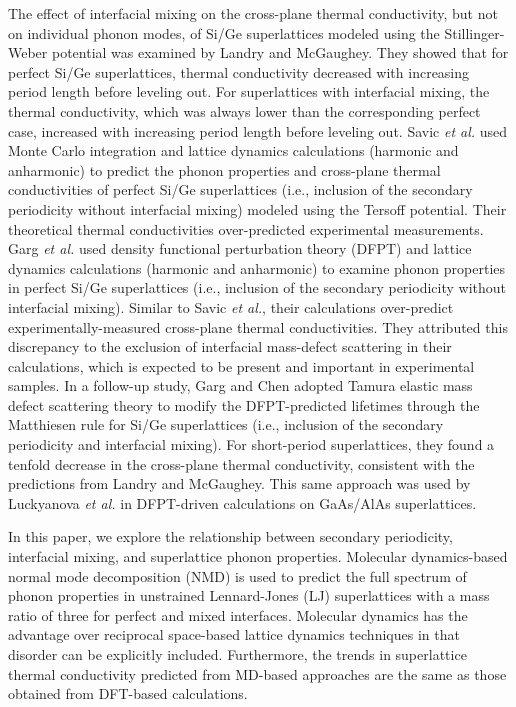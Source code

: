 \documentclass[aps,prb,preprint,preprintnumbers,amsmath,amssymb,floatfix,superscriptaddress]{revtex4}
\begin{document}
The effect of interfacial mixing on the cross-plane thermal conductivity, but not on individual phonon modes, of Si/Ge superlattices modeled using the Stillinger-Weber potential was examined by Landry and McGaughey.\cite{PhysRevB.79.075316} They showed that for perfect Si/Ge superlattices, thermal conductivity decreased with increasing period length before leveling out. For superlattices with interfacial mixing, the thermal conductivity, which was always lower than the corresponding perfect case, increased with increasing period length before leveling out. Savic \textit{et al.} used Monte Carlo integration and lattice dynamics calculations (harmonic and anharmonic) to predict the phonon properties and cross-plane thermal conductivities of perfect Si/Ge superlattices (i.e., inclusion of the secondary periodicity without interfacial mixing) modeled using the Tersoff potential. \cite{savic:073113} Their theoretical thermal conductivities over-predicted experimental measurements. Garg \textit{et al.} used density functional perturbation theory (DFPT) and lattice dynamics calculations (harmonic and anharmonic) to examine phonon properties in perfect Si/Ge superlattices (i.e., inclusion of the secondary periodicity without interfacial mixing).\cite{doi:10.1021/nl202186y} Similar to Savic \textit{et al.}, their calculations over-predict experimentally-measured cross-plane thermal conductivities. They attributed this discrepancy to the exclusion of interfacial mass-defect scattering in their calculations, which is expected to be present and important in experimental samples. In a follow-up study, Garg and Chen adopted Tamura elastic mass defect scattering theory \cite{tamura_isotope_1983} to modify the DFPT-predicted lifetimes through the Matthiesen rule for Si/Ge superlattices (i.e., inclusion of the secondary periodicity and interfacial mixing).\cite{PhysRevB.87.140302} For short-period superlattices, they found a tenfold decrease in the cross-plane thermal conductivity, consistent with the predictions from Landry and McGaughey.\cite{PhysRevB.79.075316} This same approach was used by Luckyanova \textit{et al.} \cite{Luckyanova16112012} in DFPT-driven calculations on GaAs/AlAs superlattices.

In this paper, we explore the relationship between secondary periodicity, interfacial mixing, and superlattice phonon properties. Molecular dynamics-based normal mode decomposition (NMD) is used to predict the full spectrum of phonon properties in unstrained Lennard-Jones (LJ) superlattices with a mass ratio of three for perfect and mixed interfaces. Molecular dynamics has the advantage over reciprocal space-based lattice dynamics techniques in that disorder can be explicitly included. Furthermore, the trends in superlattice thermal conductivity predicted from MD-based approaches are the same as those obtained from DFT-based calculations.\cite{PhysRevB.79.075316,PhysRevB.72.174302,doi:10.1021/nl202186y,PhysRevB.87.140302,Luckyanova16112012} 
\end{document}
